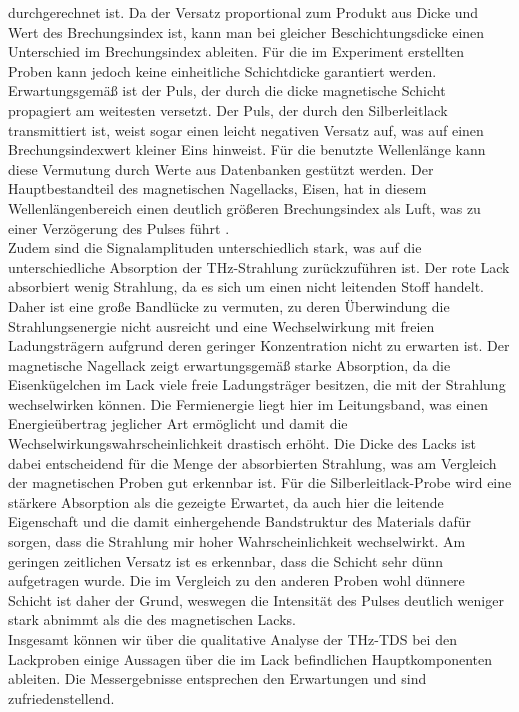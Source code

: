 durchgerechnet ist. Da der Versatz proportional zum 
Produkt aus Dicke und Wert des Brechungsindex ist, 
kann man bei gleicher Beschichtungsdicke einen 
Unterschied im Brechungsindex ableiten. 
Für die im Experiment erstellten Proben kann 
jedoch keine einheitliche Schichtdicke garantiert werden.
Erwartungsgemäß ist der Puls, der durch die dicke magnetische Schicht propagiert
am weitesten versetzt. Der Puls, der durch den Silberleitlack 
transmittiert ist, weist sogar einen leicht negativen Versatz auf, was 
auf einen Brechungsindexwert kleiner Eins hinweist. 
Für die benutzte Wellenlänge kann diese Vermutung durch 
Werte aus Datenbanken gestützt werden. Der Hauptbestandteil 
des magnetischen Nagellacks, Eisen, hat in diesem Wellenlängenbereich 
einen deutlich größeren Brechungsindex als Luft, was zu einer Verzögerung des 
Pulses führt \cite{Database}. \\
Zudem sind die Signalamplituden unterschiedlich stark, was 
auf die unterschiedliche Absorption der THz-Strahlung zurückzuführen 
ist. Der rote Lack absorbiert wenig Strahlung, da es sich 
um einen nicht leitenden Stoff handelt. Daher ist eine 
große Bandlücke zu vermuten, zu deren Überwindung die 
Strahlungsenergie nicht ausreicht und eine Wechselwirkung mit freien 
Ladungsträgern aufgrund deren geringer Konzentration nicht zu 
erwarten ist. Der magnetische Nagellack zeigt erwartungsgemäß 
starke Absorption, da die Eisenkügelchen im Lack viele 
freie Ladungsträger besitzen, die mit der Strahlung wechselwirken
können. Die Fermienergie liegt hier im Leitungsband, was 
einen Energieübertrag jeglicher Art ermöglicht und 
damit die Wechselwirkungswahrscheinlichkeit drastisch erhöht.
Die Dicke des Lacks ist dabei entscheidend für die Menge der absorbierten Strahlung, 
was am Vergleich der magnetischen Proben gut erkennbar ist. 
Für die Silberleitlack-Probe wird eine stärkere Absorption als die 
gezeigte Erwartet, da auch hier die leitende Eigenschaft und die 
damit einhergehende Bandstruktur des Materials dafür sorgen, 
dass die Strahlung mir hoher Wahrscheinlichkeit wechselwirkt. 
Am geringen zeitlichen Versatz ist es erkennbar, dass die 
Schicht sehr dünn aufgetragen wurde. Die im Vergleich zu den 
anderen Proben wohl dünnere Schicht ist daher der Grund, 
weswegen die Intensität des Pulses deutlich weniger stark abnimmt 
als die des magnetischen Lacks. \\
Insgesamt können wir über die qualitative Analyse der THz-TDS bei den 
Lackproben einige Aussagen über die im Lack befindlichen Hauptkomponenten 
ableiten. Die Messergebnisse entsprechen den Erwartungen und sind 
zufriedenstellend.